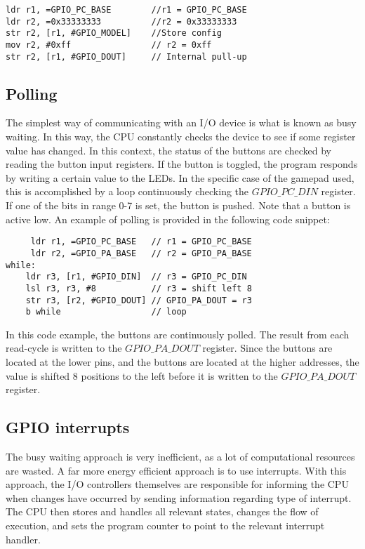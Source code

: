 \begin{lstlisting}
ldr r1, =GPIO_PC_BASE        //r1 = GPIO_PC_BASE
ldr r2, =0x33333333          //r2 = 0x33333333  
str r2, [r1, #GPIO_MODEL]    //Store config
mov r2, #0xff                // r2 = 0xff
str r2, [r1, #GPIO_DOUT]     // Internal pull-up

\end{lstlisting}





\subsection{Polling}\label{ch:polling}
The simplest way of communicating with an I/O device is what is known as busy waiting\cite[p. ]{wolf}. In this way, the CPU constantly checks the device to see if some register value has changed. In this context, the status of the buttons are checked by reading the button input registers. If the button is toggled, the program responds by writing a certain value to the LEDs. In the specific case of the gamepad used, this is accomplished by a loop continuously checking the $GPIO\_PC\_DIN$ register. If one of the bits in range 0-7 is set, the button is pushed. Note that a button is active low. An example of polling is provided in the following code snippet:

\begin{lstlisting}
     ldr r1, =GPIO_PC_BASE   // r1 = GPIO_PC_BASE
     ldr r2, =GPIO_PA_BASE   // r2 = GPIO_PA_BASE
while:
    ldr r3, [r1, #GPIO_DIN]  // r3 = GPIO_PC_DIN
    lsl r3, r3, #8           // r3 = shift left 8  
    str r3, [r2, #GPIO_DOUT] // GPIO_PA_DOUT = r3
    b while                  // loop
\end{lstlisting}

In this code example, the buttons are continuously polled. The result from each read-cycle is written to the $GPIO\_PA\_DOUT$ register. Since the buttons are located at the lower pins, and the buttons are located at the higher addresses, the value is shifted 8 positions to the left before it is written to the $GPIO\_PA\_DOUT$ register. 

\subsection{GPIO interrupts}\label{ch:interrupts}
The busy waiting approach is very inefficient, as a lot of computational resources are wasted. A far more energy efficient approach is to use interrupts. With this approach, the I/O controllers themselves are responsible for informing the CPU when changes have occurred by sending information regarding type of interrupt. The CPU then stores and handles all relevant states, changes the flow of execution, and sets the program counter to point to the relevant interrupt handler.

